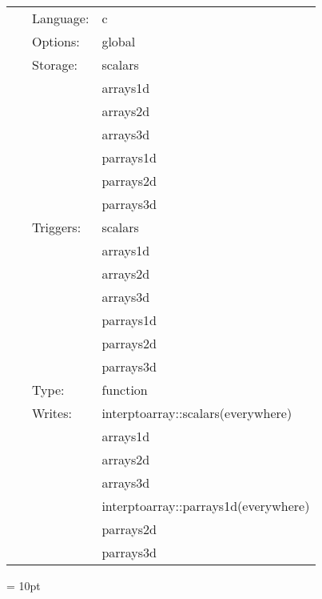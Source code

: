  \begin{tabular*}{160mm}{cll} 
~ & Language:  & c \\ 
~ & Options:  & global \\ 
~ & Storage:  & scalars \\ 
~& ~ &arrays1d\\ 
~& ~ &arrays2d\\ 
~& ~ &arrays3d\\ 
~& ~ &parrays1d\\ 
~& ~ &parrays2d\\ 
~& ~ &parrays3d\\ 
~ & Triggers:  & scalars \\ 
~& ~ &arrays1d\\ 
~& ~ &arrays2d\\ 
~& ~ &arrays3d\\ 
~& ~ &parrays1d\\ 
~& ~ &parrays2d\\ 
~& ~ &parrays3d\\ 
~ & Type:  & function \\ 
~ & Writes:  & interptoarray::scalars(everywhere) \\ 
~& ~ &arrays1d\\ 
~& ~ &arrays2d\\ 
~& ~ &arrays3d\\ 
~& ~ &interptoarray::parrays1d(everywhere)\\ 
~& ~ &parrays2d\\ 
~& ~ &parrays3d\\ 
\end{tabular*} 



\vspace{5mm}\parskip = 10pt 


